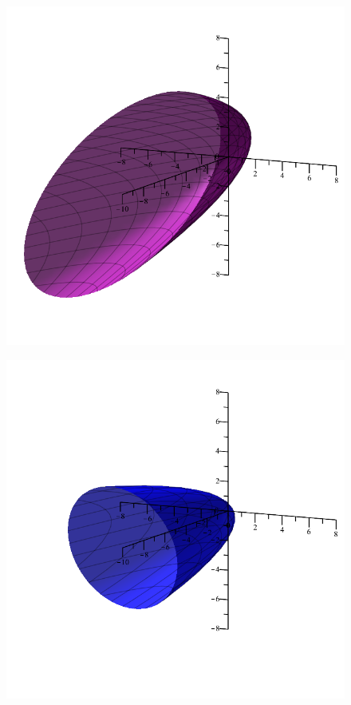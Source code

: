 \documentclass[12pt]{article}
\begin{document}
\begin{figure}[H]
	\centering
	\begin{minipage}{.3\textwidth}
		\centering
		\includegraphics[width=\linewidth]{mob7Cyc2.png}
		\label{fig:test1}
	\end{minipage}%
	\begin{minipage}{.3\textwidth}
		\centering
		\includegraphics[width=\linewidth]{mob7Cyc4.png}

\end{minipage}
\end{figure}
\end{document}
